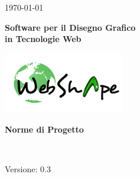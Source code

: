 
\title{\TITOLODOC}
\author{Mirco Geremia}



\renewcommand{\insertversion}{0.3} %
\renewcommand{\TITOLODOC}{Norme di Progetto} %
\renewcommand{\glosspath}{.\glossario} %

\begin{titlepage}
\begin{center}
	\begin{Large}	\today \end{Large}
\end{center}

\vspace{20pt}

\begin{center}
	\begin{Huge}
				\textbf{\ajax}
	\end{Huge}
\end{center}			

\begin{center}
	\begin{large}
				\textbf{Software per il Disegno Grafico\\ in Tecnologie Web}
	\end{large}
\end{center}			

\vspace{20pt}

\begin{center}
\includegraphics[width=150pt]{../logo/logo}
\end{center}

\vspace{170pt}
\begin{center} %
	\begin{Huge}
				\textbf{\TITOLODOC}
	\end{Huge}
			\\
\end{center}
\vspace{210pt}
\begin{center}
Versione: \insertversion
\end{center}
\end{titlepage}

